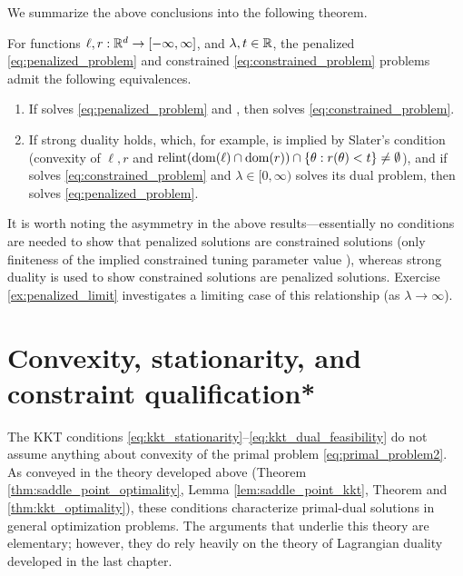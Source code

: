 We summarize the above conclusions into the following theorem.

\begin{Theorem}
\label{thm:constrained_penalized}
For functions $\ell,r : \mathbb{R}^d \to [-\infty, \infty]$, and $\lambda,t \in \mathbb{R}$, the
penalized \eqref{eq:penalized_problem} and constrained
\eqref{eq:constrained_problem} problems admit the following equivalences.     

\begin{enumerate}[label=(\roman*)]
\item If \smash{$\htheta$} solves \eqref{eq:penalized_problem} and , then \smash{$\htheta$} solves
  \eqref{eq:constrained_problem}. 

\item If strong duality holds, which, for example, is implied by Slater's 
  condition (convexity of $\ell,r$ and $\operatorname{relint}(\operatorname{dom}(\ell) \cap \operatorname{dom}(r)) \cap \{
  \theta : r(\theta) < t\} \not= \emptyset$), and if \smash{$\htheta$} solves
  \eqref{eq:constrained_problem} and $\lambda \in [0,\infty)$ solves its dual
  problem, then \smash{$\htheta$} solves \eqref{eq:penalized_problem}.     
\end{enumerate} 
\end{Theorem}

It is worth noting the asymmetry in the above results---essentially no
conditions are needed to show that penalized solutions are constrained solutions
(only finiteness of the implied constrained tuning parameter value ), whereas strong duality is used to show constrained solutions
are penalized solutions. Exercise \ref{ex:penalized_limit} investigates a
limiting case of this relationship (as $\lambda \to \infty$).

\section{Convexity, stationarity, and constraint qualification*} 
\label{sec:convexity_stationarity_cq}

The KKT conditions \eqref{eq:kkt_stationarity}--\eqref{eq:kkt_dual_feasibility}
do not assume anything about convexity of the primal problem
\eqref{eq:primal_problem2}. As conveyed in the theory developed above (Theorem  
\ref{thm:saddle_point_optimality}, Lemma \ref{lem:saddle_point_kkt}, Theorem
and \ref{thm:kkt_optimality}), these conditions characterize primal-dual solutions
in general optimization problems. The arguments that underlie this theory are
elementary; however, they do rely heavily on the theory of Lagrangian duality
developed in the last chapter.   

